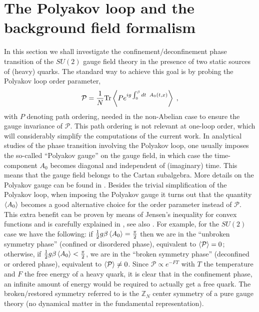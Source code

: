 \section{The Polyakov loop and the background field formalism}
\label{Ploop}
In this section we shall investigate the confinement/deconfinement phase transition
of the $SU(2)$ gauge field theory in the presence of two static sources
of (heavy) quarks. The standard way
to achieve this goal is by probing the Polyakov loop order parameter,
\begin{eqnarray}
\mathcal{P} = \frac{1}{N}\mathrm{Tr} \Braket{P e^{ig\int_{0}^{\beta}dt \;\;
A_{0}(t,x)}}\;,
\end{eqnarray}
with $P$ denoting path ordering, needed in the non-Abelian case to ensure
the gauge invariance of $\mathcal{P}$. This path ordering is not relevant at
one-loop order, which will considerably simplify the computations of the current work. In analytical studies of the phase transition involving the
Polyakov loop, one usually imposes the so-called ``Polyakov gauge'' on the
gauge field, in which case the time-component $A_{0}$ becomes diagonal and
independent of (imaginary) time. This means that the gauge field belongs to the Cartan
subalgebra. More details on the Polyakov gauge can be found in
\cite{Marhauser:2008fz,Fukushima:2003fw,Ratti:2005jh}. Besides the trivial
simplification of the Polyakov loop, when imposing the Polyakov gauge it
turns out that the quantity $\Braket{A_{0}}$ becomes a good alternative choice for the order
parameter instead of $\mathcal{P}$. This extra benefit can be proven by means of Jensen's
inequality for convex functions and is carefully explained in \cite{Marhauser:2008fz}, see also
\cite{Braun:2007bx,Reinhardt:2012qe,Reinhardt:2013iia,Heffner:2015zna,Reinosa:2014ooa}. For
example, for the $SU(2)$ case we have the following: if $\frac{1}{2}g\beta%
\Braket{A_{0}} = \frac{\pi}{2}$ then we are in the ``unbroken symmetry phase''
(confined or disordered phase), equivalent to $\Braket{{\cal P}} = 0$;
otherwise, if $\frac{1}{2}g\beta\Braket{A_{0}} < \frac{\pi}{2}$, we are in the
``broken symmetry phase'' (deconfined or ordered phase), equivalent to
$\Braket{{\cal P}} \neq 0$. Since $\mathcal{P}\propto e^{-F T}$ with $T$ the temperature and
$F$ the free energy of a heavy quark, it is clear that in the confinement phase, an infinite
amount of energy would be required to actually get a free quark. The broken/restored symmetry
referred to is the $\mathbb{Z}_N$ center symmetry of a pure gauge theory (no dynamical matter
in the fundamental representation).

